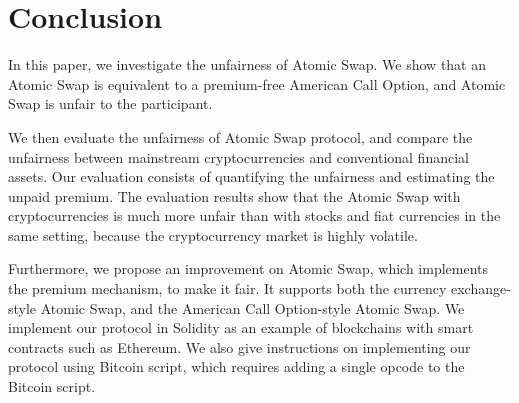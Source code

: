 \section{Conclusion}
\label{sec:conclusion}


In this paper, we investigate the unfairness of Atomic Swap.
We show that an Atomic Swap is equivalent to a premium-free American Call Option, and Atomic Swap is unfair to the participant.

We then evaluate the unfairness of Atomic Swap protocol, and compare the unfairness between mainstream cryptocurrencies and conventional financial assets.
Our evaluation consists of quantifying the unfairness and estimating the unpaid premium.
The evaluation results show that the Atomic Swap with cryptocurrencies is much more unfair than with stocks and fiat currencies in the same setting, because the cryptocurrency market is highly volatile.

Furthermore, we propose an improvement on Atomic Swap, which implements the premium mechanism, to make it fair.
It supports both the currency exchange-style Atomic Swap, and the American Call Option-style Atomic Swap.
We implement our protocol in Solidity as an example of blockchains with smart contracts such as Ethereum.
We also give instructions on implementing our protocol using Bitcoin script, which requires adding a single opcode to the Bitcoin script.